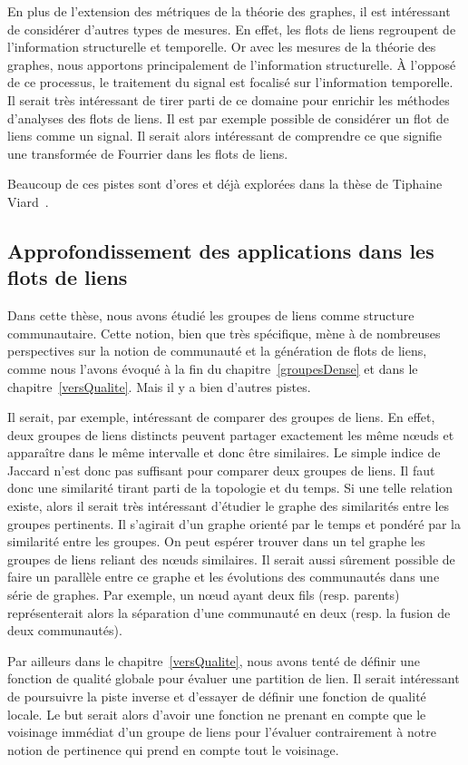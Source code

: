 En plus de l'extension des métriques de la théorie  des graphes, il est intéressant de considérer d'autres types de mesures.
En effet, les flots de liens regroupent de l'information structurelle et temporelle.
Or avec les mesures de la théorie des graphes, nous apportons principalement de l'information structurelle.
\`A l'opposé de ce processus, le traitement du signal est focalisé sur l'information temporelle.
Il serait très intéressant de tirer parti de ce domaine pour enrichir les méthodes d'analyses des flots de liens.
Il est par exemple possible de considérer un flot de liens comme un signal.
Il serait alors intéressant de comprendre ce que signifie une transformée de Fourrier dans les flots de liens.

Beaucoup de ces pistes sont d'ores et déjà explorées dans la thèse de Tiphaine Viard~\cite{viard2016flots}.

\subsection{Approfondissement des applications dans les flots de liens}
Dans cette thèse, nous avons étudié les groupes de liens comme structure communautaire.
Cette notion, bien que très spécifique, mène à de nombreuses perspectives sur la notion de communauté et la génération de flots de liens, comme nous l'avons évoqué à la fin du chapitre~\ref{groupesDense} et dans le chapitre~\ref{versQualite}.
Mais il y a bien d'autres pistes.

Il serait, par exemple, intéressant de comparer des groupes de liens.
En effet, deux groupes de liens distincts peuvent partager exactement les même n\oe{}uds et apparaître dans le même intervalle et donc être similaires.
Le simple indice de Jaccard n'est donc pas suffisant pour comparer deux groupes de liens.
Il faut donc une similarité tirant parti de la topologie et du temps.
Si une telle relation existe, alors il serait très intéressant d'étudier le graphe des similarités entre les groupes pertinents.
Il s'agirait d'un graphe orienté par le temps et pondéré par la similarité entre les groupes.
On peut espérer trouver dans un tel graphe les groupes de liens reliant des n\oe{}uds similaires.
Il serait aussi sûrement possible de faire un parallèle entre ce graphe et les évolutions des communautés dans une série de graphes.
Par exemple, un n\oe{}ud ayant deux fils (resp. parents) représenterait alors la séparation d'une communauté en deux (resp. la fusion de deux communautés).

Par ailleurs dans le chapitre~\ref{versQualite}, nous avons tenté de définir une fonction de qualité globale pour évaluer une partition de lien.
Il serait intéressant de poursuivre la piste inverse et d'essayer de définir une fonction de qualité locale.
Le but serait alors d'avoir une fonction ne prenant en compte que le voisinage immédiat d'un groupe de liens pour l'évaluer contrairement à notre notion de pertinence qui prend en compte tout le voisinage.

